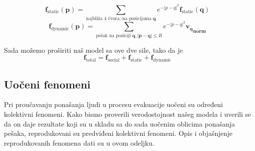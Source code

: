 \documentclass[12pt]{article}
\begin{document}
	$$
		\mathbf f_\text{static} (\mathbf p) = \sum_{\text{najbliža 4 čvora, na pozicijama } \mathbf q} e^{-|p-q|^2} \mathbf f_\text{static} (\mathbf q)
	$$
	$$
		\mathbf f_\text{dynamic} (\mathbf p) = \sum_{\text{pešak na poziciji } \mathbf q, |\mathbf p-\mathbf q| \leq R} e^{-|p-q|^2} \mathbf{{v_q}_{norm}}
	$$	
	
	Sada možemo proširiti naš model sa ove dve sile, tako da je
	$$
		\mathbf f_\text{total} = \mathbf f_\text{social} + \mathbf f_\text{static} + \mathbf f_\text{dynamic}
	$$
	
	     
    \subsection{Uočeni fenomeni}
    Pri proučavanju ponašanja ljudi u procesu evakuacije uočeni su određeni kolektivni fenomeni. Kako bismo proverili verodostojnost našeg modela i uverili se da on daje rezultate koji su u skladu sa do sada uočenim oblicima ponašanja pešaka, reprodukovani su predviđeni kolektivni fenomeni. Opis i objašnjenje reprodukovanih fenomena dati su u ovom odeljku.
\end{document}
